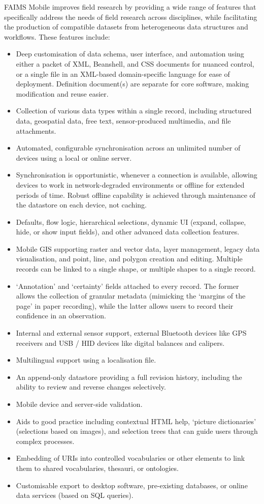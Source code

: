 \documentclass[preprint,12pt, a4paper]{elsarticle}
\begin{document}
FAIMS Mobile improves field research by providing a wide range of features that specifically address the needs of field research across disciplines, while facilitating the production of compatible datasets from  heterogeneous data structures and workflows. These features include:
\begin{itemize}
\item Deep customisation of data schema, user interface, and automation using either a packet of XML, Beanshell, and CSS documents for nuanced control, or a single file in an XML-based domain-specific language for ease of deployment. Definition document(s) are separate for core software, making modification and reuse easier.
\item Collection of various data types within a single record, including structured data, geospatial data, free text, sensor-produced multimedia, and file attachments.
\item Automated, configurable synchronisation across an unlimited number of devices using a local or online server. 
\item Synchronisation is opportunistic, whenever a connection is available, allowing devices to work in network-degraded environments or offline for extended periods of time. Robust offline capability is achieved through maintenance of the datastore on each device, not caching.
\item Defaults, flow logic, hierarchical selections, dynamic UI (expand, collapse, hide, or show input fields), and other advanced data collection features.
\item Mobile GIS supporting raster and vector data, layer management, legacy data visualisation, and point, line, and polygon creation and editing. Multiple records can be linked to a single shape, or multiple shapes to a single record.
\item `Annotation' and `certainty' fields attached to every record. The former allows the collection of granular metadata (mimicking the `margins of the page' in paper recording), while the latter allows users to record their confidence in an observation. 
\item Internal and external sensor support, external Bluetooth devices like GPS receivers and USB / HID devices like digital balances and calipers.
\item Multilingual support using a localisation file.
\item An append-only datastore providing a full revision history, including the ability to review and reverse changes selectively.
\item Mobile device and server-side validation.
\item Aids to good practice including contextual HTML help, `picture dictionaries' (selections based on images), and selection trees that can guide users through complex processes.
\item Embedding of URIs into controlled vocabularies or other elements to link them to shared vocabularies, thesauri, or ontologies.
\item Customisable export to desktop software, pre-existing databases, or online data services (based on SQL queries).
\end{itemize}
\end{document}
